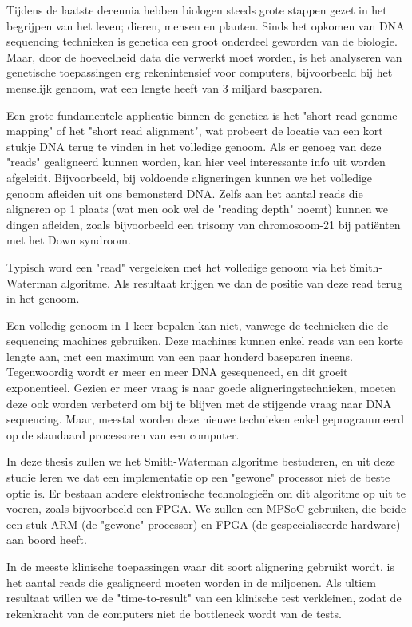 Tijdens de laatste decennia hebben biologen steeds grote stappen gezet in het begrijpen van het leven; dieren, mensen en planten. Sinds het opkomen van DNA sequencing technieken is genetica een groot onderdeel geworden van de biologie. Maar, door de hoeveelheid data die verwerkt moet worden, is het analyseren van genetische toepassingen erg rekenintensief voor computers, bijvoorbeeld bij het menselijk genoom, wat een lengte heeft van 3 miljard baseparen.

Een grote fundamentele applicatie binnen de genetica is het "short read genome mapping" of het "short read alignment", wat probeert de locatie van een kort stukje DNA terug te vinden in het volledige genoom. Als er genoeg van deze "reads" gealigneerd kunnen worden, kan hier veel interessante info uit worden afgeleidt. Bijvoorbeeld, bij voldoende aligneringen kunnen we het volledige genoom afleiden uit ons bemonsterd DNA. Zelfs aan het aantal reads die aligneren op 1 plaats (wat men ook wel de "reading depth" noemt) kunnen we dingen afleiden, zoals bijvoorbeeld een trisomy van chromosoom-21 bij pati\"enten met het Down syndroom.

Typisch word een "read" vergeleken met het volledige genoom via het Smith-Waterman algoritme. Als resultaat krijgen we dan de positie van deze read terug in het genoom.

Een volledig genoom in 1 keer bepalen kan niet, vanwege de technieken die de sequencing machines gebruiken. Deze machines kunnen enkel reads van een korte lengte aan, met een maximum van een paar honderd baseparen ineens. Tegenwoordig wordt er meer en meer DNA gesequenced, en dit groeit exponentieel. Gezien er meer vraag is naar goede aligneringstechnieken, moeten deze ook worden verbeterd om bij te blijven met de stijgende vraag naar DNA sequencing. Maar, meestal worden deze nieuwe technieken enkel geprogrammeerd op de standaard processoren van een computer.

In deze thesis zullen we het Smith-Waterman algoritme bestuderen, en uit deze studie leren we dat een implementatie op een "gewone" processor niet de beste optie is. Er bestaan andere elektronische technologie\"en om dit algoritme op uit te voeren, zoals bijvoorbeeld een FPGA. We zullen een MPSoC gebruiken, die beide een stuk ARM (de "gewone" processor) en FPGA (de gespecialiseerde hardware) aan boord heeft.

In de meeste klinische toepassingen waar dit soort alignering gebruikt wordt, is het aantal reads die gealigneerd moeten worden in de miljoenen. Als ultiem resultaat willen we de "time-to-result" van een klinische test verkleinen, zodat de rekenkracht van de computers niet de bottleneck wordt van de tests.

